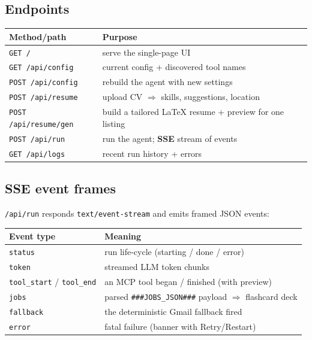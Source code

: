 \documentclass[11pt,a4paper]{article}
\newcommand{\file}[1]{\texttt{\small #1}}
\newcommand{\tool}[1]{\texttt{#1}}
\begin{document}
\subsection{Endpoints}
\begin{center}
\begin{tabular}{@{}ll@{}}
\toprule
\textbf{Method/path} & \textbf{Purpose}\\
\midrule
\file{GET /} & serve the single-page UI\\
\file{GET /api/config} & current config + discovered tool names\\
\file{POST /api/config} & rebuild the agent with new settings\\
\file{POST /api/resume} & upload CV $\Rightarrow$ skills, suggestions, location\\
\file{POST /api/resume/gen} & build a tailored LaTeX resume + preview for one listing\\
\file{POST /api/run} & run the agent; \textbf{SSE} stream of events\\
\file{GET /api/logs} & recent run history + errors\\
\bottomrule
\end{tabular}
\end{center}

\subsection{SSE event frames}
\file{/api/run} responds \tool{text/event-stream} and emits framed JSON events:

\begin{center}
\begin{tabular}{@{}ll@{}}
\toprule
\textbf{Event type} & \textbf{Meaning}\\
\midrule
\file{status} & run life-cycle (starting / done / error)\\
\file{token} & streamed LLM token chunks\\
\file{tool\_start} / \file{tool\_end} & an MCP tool began / finished (with preview)\\
\file{jobs} & parsed \tool{###JOBS\_JSON###} payload $\Rightarrow$ flashcard deck\\
\file{fallback} & the deterministic Gmail fallback fired\\
\file{error} & fatal failure (banner with Retry/Restart)\\
\bottomrule
\end{tabular}
\end{center}
\end{document}
